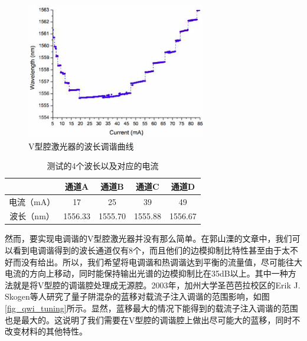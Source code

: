 \documentclass{ZJUthesis}
\begin{document}
\begin{figure}[!htb]
    \centering
    \includegraphics[width=0.7\textwidth]{./Pictures/GSL_tuning.eps}
    \caption{V型腔激光器的波长调谐曲线}
    \label{fig_gsl_tuning}
\end{figure}

\begin{table}[!t]
    \caption{测试的4个波长以及对应的电流}
    \centering
    \label{tab_4wavelength}
    \begin{tabular}{ccccc}
        \hline
        \hline
         & 通道A & 通道B & 通道C & 通道D\\
        \hline
        电流（mA） & 17 & 25 & 	39 & 49\\
        波长（nm） & 1556.33 & 1555.70 & 1555.88 & 1556.67\\
        \hline
        \hline
    \end{tabular}
\end{table}

然而，要实现电调谐的V型腔激光器并没有那么简单。在郭山溧的文章中，我们可以看到电调谐得到的波长通道仅有8个，而且他们的边模抑制比特性甚至由于太不好而没有给出。所以，我们希望将电调谐和热调谐达到平衡的流量值，尽可能往大电流的方向上移动，同时能保持输出光谱的边模抑制比在35dB以上。其中一种方法就是将V型腔的调谐腔处理成无源腔。2003年，加州大学圣芭芭拉校区的Erik J. Skogen等人研究了量子阱混杂的蓝移对载流子注入调谐的范围影响，如图\ref{fig_qwi_tuning}所示。显然，蓝移最大的情况下能得到的载流子注入调谐的范围也是最大的。这说明了我们需要在V型腔的调谐腔上做出尽可能大的蓝移，同时不改变材料的其他特性。
\end{document}
